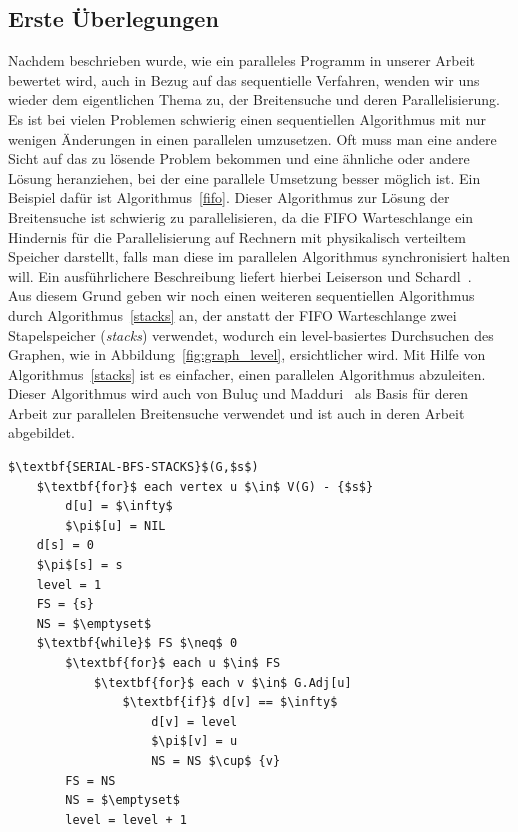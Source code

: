\documentclass[11pt,a4paper]{article}
\begin{document}
\subsection{Erste Überlegungen}
Nachdem beschrieben wurde, wie ein paralleles Programm in unserer Arbeit bewertet wird, auch in Bezug auf das sequentielle Verfahren, wenden wir uns wieder dem eigentlichen Thema zu, der Breitensuche und deren Parallelisierung. Es ist bei vielen Problemen schwierig einen sequentiellen Algorithmus mit nur wenigen Änderungen in einen parallelen umzusetzen. Oft muss man eine andere Sicht auf das zu lösende Problem bekommen und eine ähnliche oder andere Lösung heranziehen, bei der eine parallele Umsetzung besser möglich ist. Ein Beispiel dafür ist Algorithmus~\ref{fifo}.  Dieser Algorithmus zur Lösung der Breitensuche ist schwierig zu parallelisieren, da die FIFO Warteschlange ein Hindernis für die Parallelisierung auf Rechnern mit physikalisch verteiltem Speicher darstellt, falls man diese im parallelen Algorithmus synchronisiert halten will. Ein ausführlichere Beschreibung liefert hierbei Leiserson und Schardl~\cite{leiserson}.\\
Aus diesem Grund geben wir noch einen weiteren sequentiellen Algorithmus durch Algorithmus~\ref{stacks} an, der anstatt der FIFO Warteschlange zwei Stapelspeicher (\textit{stacks}) verwendet, wodurch ein level-basiertes Durchsuchen des Graphen, wie in Abbildung~\ref{fig:graph_level}, ersichtlicher wird. Mit Hilfe von Algorithmus~\ref{stacks} ist es einfacher, einen parallelen Algorithmus abzuleiten. Dieser Algorithmus wird auch von Buluç und Madduri~\cite{buluc} als Basis für deren Arbeit zur parallelen Breitensuche verwendet und ist auch in deren Arbeit abgebildet.
\begin{lstlisting}[caption={Eine weitere sequentielle Variante der Breitensuche unter Verwendung von zwei Stacks \lstinline{FS} und \lstinline{NS} als Datenstrukturen. Dieser Algorithmus liefert das gleiche Ergebnis wie Algorithmus~\ref{fifo} und hat auch die gleiche Laufzeit wie dieser, ermöglicht jedoch eine bessere Sicht auf das level-basierte Durchsuchen des Graphen, was das Ableiten eines parallelen Algorithmus einfacher macht.},label=stacks]
$\textbf{SERIAL-BFS-STACKS}$(G,$s$)
	$\textbf{for}$ each vertex u $\in$ V(G) - {$s$}
		d[u] = $\infty$
		$\pi$[u] = NIL
	d[s] = 0
	$\pi$[s] = s
	level = 1
	FS = {s}
	NS = $\emptyset$
	$\textbf{while}$ FS $\neq$ 0
		$\textbf{for}$ each u $\in$ FS
			$\textbf{for}$ each v $\in$ G.Adj[u]
				$\textbf{if}$ d[v] == $\infty$
					d[v] = level
					$\pi$[v] = u
					NS = NS $\cup$ {v}
		FS = NS
		NS = $\emptyset$
		level = level + 1
\end{lstlisting}
\end{document}
